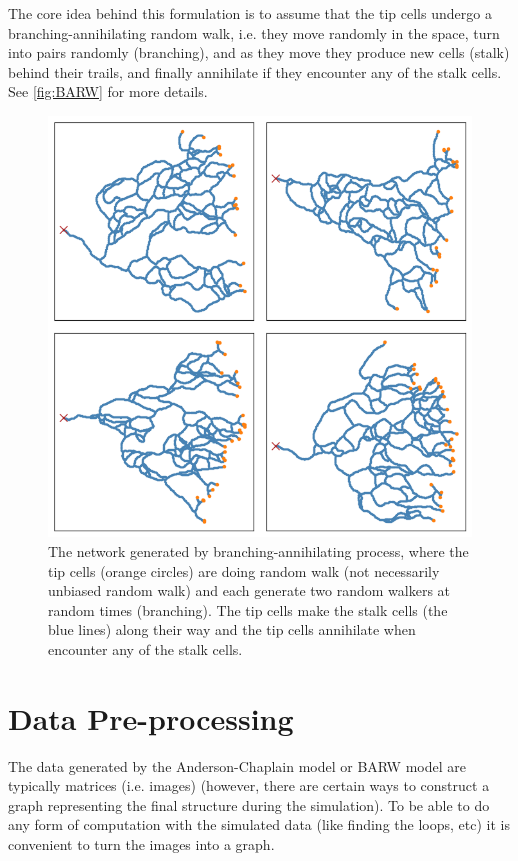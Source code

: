\documentclass[10pt,a4paper,twocolumn]{article}
\begin{document}
	The core idea behind this formulation is to assume that the tip cells undergo a branching-annihilating random walk, i.e. they move randomly in the space, turn into pairs randomly (branching), and as they move they produce new cells (stalk) behind their trails, and finally annihilate if they encounter any of the stalk cells. See \autoref{fig:BARW} for more details.
	
	\begin{figure}[h!]
		\centering
		\includegraphics[width=1\linewidth]{images/BARW}
		\caption{The network generated by branching-annihilating process, where the tip cells (orange circles) are doing random walk (not necessarily unbiased random walk) and each generate two random walkers at random times (branching). The tip cells make the stalk cells (the blue lines) along their way and the tip cells annihilate when encounter any of the stalk cells.}
		\label{fig:BARW}
	\end{figure}
	
	
	\section{Data Pre-processing}
	The data generated by the Anderson-Chaplain model or BARW model are typically matrices (i.e. images) (however, there are certain ways to construct a graph representing the final structure during the simulation). To be able to do any form of computation with the simulated data (like finding the loops, etc) it is convenient to turn the images into a graph.
	
\end{document}
